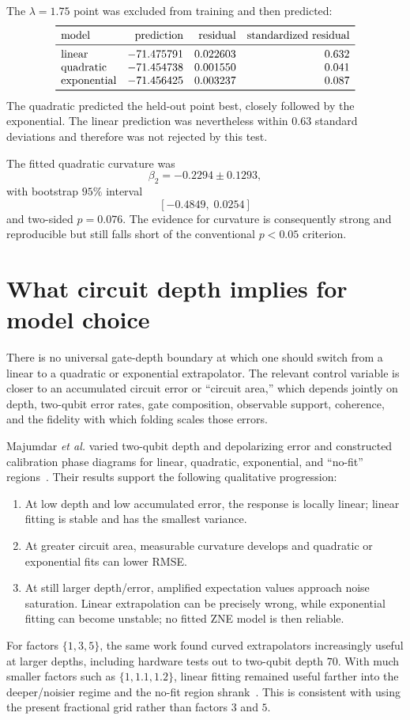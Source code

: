 \documentclass[11pt]{article}
\begin{document}
The $\lambda=1.75$ point was excluded from training and then predicted:
\[
\begin{array}{lrrr}
\toprule
\text{model} & \text{prediction} & \text{residual}
             & \text{standardized residual}\\
\midrule
\text{linear}      & -71.475791 & 0.022603 & 0.632\\
\text{quadratic}   & -71.454738 & 0.001550 & 0.041\\
\text{exponential} & -71.456425 & 0.003237 & 0.087\\
\bottomrule
\end{array}
\]
The quadratic predicted the held-out point best, closely followed by the
exponential.  The linear prediction was nevertheless within $0.63$ standard
deviations and therefore was not rejected by this test.

The fitted quadratic curvature was
\[
  \beta_2=-0.2294\pm0.1293,
\]
with bootstrap $95\%$ interval
\[
  [-0.4849,\;0.0254]
\]
and two-sided $p=0.076$.  The evidence for curvature is consequently strong
and reproducible but still falls short of the conventional $p<0.05$
criterion.

\section{What circuit depth implies for model choice}

There is no universal gate-depth boundary at which one should switch from a
linear to a quadratic or exponential extrapolator.  The relevant control
variable is closer to an accumulated circuit error or ``circuit area,'' which
depends jointly on depth, two-qubit error rates, gate composition, observable
support, coherence, and the fidelity with which folding scales those errors.

Majumdar \emph{et al.} varied two-qubit depth and depolarizing error and
constructed calibration phase diagrams for linear, quadratic, exponential,
and ``no-fit'' regions~\cite{majumdar2023}.  Their results support the
following qualitative progression:
\begin{enumerate}
  \item At low depth and low accumulated error, the response is locally
        linear; linear fitting is stable and has the smallest variance.
  \item At greater circuit area, measurable curvature develops and quadratic
        or exponential fits can lower RMSE.
  \item At still larger depth/error, amplified expectation values approach
        noise saturation.  Linear extrapolation can be precisely wrong, while
        exponential fitting can become unstable; no fitted ZNE model is then
        reliable.
\end{enumerate}
For factors $\{1,3,5\}$, the same work found curved extrapolators increasingly
useful at larger depths, including hardware tests out to two-qubit depth
$70$.  With much smaller factors such as $\{1,1.1,1.2\}$, linear fitting
remained useful farther into the deeper/noisier regime and the no-fit region
shrank~\cite{majumdar2023}.  This is consistent with using the present
fractional grid rather than factors $3$ and $5$.
\end{document}
